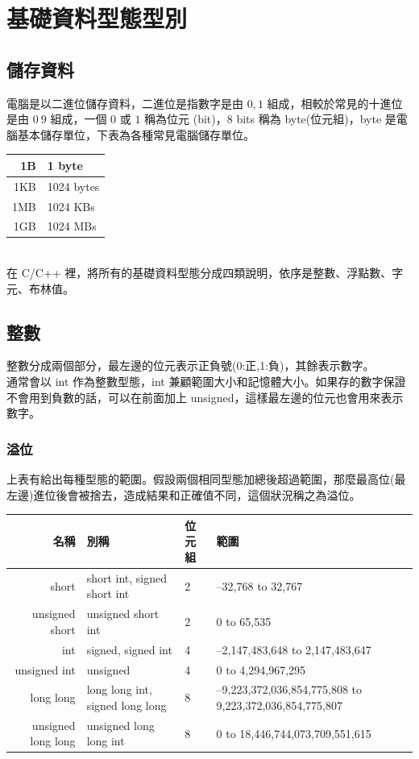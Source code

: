 \section{基礎資料型態型別}
\subsection{儲存資料}
電腦是以二進位儲存資料，二進位是指數字是由 $0,1$ 組成，相較於常見的十進位是由 $0~9$ 組成，一個 $0$ 或 $1$ 稱為位元 (bit)，8 bits 稱為 byte(位元組)，byte 是電腦基本儲存單位，下表為各種常見電腦儲存單位。\\
\begin{tabular}{|r|l|} \hline 1B & 1 byte \\\hline 1KB & 1024 bytes \\\hline 1MB & 1024 KBs \\\hline 1GB & 1024 MBs\\\hline \end{tabular}\\
在 C/C++ 裡，將所有的基礎資料型態分成四類說明，依序是整數、浮點數、字元、布林值。
\subsection{整數}
整數分成兩個部分，最左邊的位元表示正負號(0:正,1:負)，其餘表示數字。\\
通常會以 int 作為整數型態，int 兼顧範圍大小和記憶體大小。如果存的數字保證不會用到負數的話，可以在前面加上 unsigned，這樣最左邊的位元也會用來表示數字。
\subsubsection{溢位}
上表有給出每種型態的範圍。假設兩個相同型態加總後超過範圍，那麼最高位(最左邊)進位後會被捨去，造成結果和正確值不同，這個狀況稱之為溢位。

\begin{tabular}{|r|l|l|l|} \hline 名稱 & 別稱 & 位元組 & 範圍 \\\hline short & short int, signed short int & 2 & –32,768 to 32,767 \\\hline unsigned short & unsigned short int & 2 & 0 to 65,535 \\\hline int & signed, signed int & 4 & –2,147,483,648 to 2,147,483,647 \\\hline unsigned int & unsigned & 4 & 0 to 4,294,967,295 \\\hline long long & long long int, signed long long & 8 & –9,223,372,036,854,775,808 to 9,223,372,036,854,775,807 \\\hline unsigned long long & unsigned long long int & 8 & 0 to 18,446,744,073,709,551,615 \\\hline \end{tabular}\\
